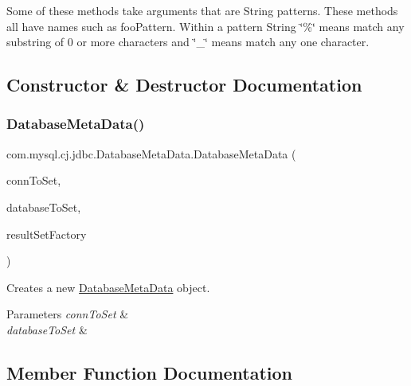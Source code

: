 Some of these methods take arguments that are String patterns. These methods all have names such as foo\+Pattern. Within a pattern String \char`\"{}\%\char`\"{} means match any substring of 0 or more characters and \char`\"{}\+\_\+\char`\"{} means match any one character. 

\subsection{Constructor \& Destructor Documentation}
\mbox{\label{classcom_1_1mysql_1_1cj_1_1jdbc_1_1_database_meta_data_a42c3cdfdc4a332f7c7bd740e2c069071}} 
\subsubsection{\texorpdfstring{Database\+Meta\+Data()}{DatabaseMetaData()}}
{\footnotesize\ttfamily com.\+mysql.\+cj.\+jdbc.\+Database\+Meta\+Data.\+Database\+Meta\+Data (\begin{DoxyParamCaption}\item[{\mbox{\hyperlink{interfacecom_1_1mysql_1_1cj_1_1jdbc_1_1_jdbc_connection}{Jdbc\+Connection}}}]{conn\+To\+Set,  }\item[{String}]{database\+To\+Set,  }\item[{\mbox{\hyperlink{classcom_1_1mysql_1_1cj_1_1jdbc_1_1result_1_1_result_set_factory}{Result\+Set\+Factory}}}]{result\+Set\+Factory }\end{DoxyParamCaption})\hspace{0.3cm}{\ttfamily [protected]}}

Creates a new \mbox{\hyperlink{classcom_1_1mysql_1_1cj_1_1jdbc_1_1_database_meta_data}{Database\+Meta\+Data}} object.


\begin{DoxyParams}{Parameters}
{\em conn\+To\+Set} & \\
\hline
{\em database\+To\+Set} & \\
\hline
\end{DoxyParams}


\subsection{Member Function Documentation}
\mbox{\label{classcom_1_1mysql_1_1cj_1_1jdbc_1_1_database_meta_data_a2b6b0b60b80c5bea15da284eeed3e8ec}} 
